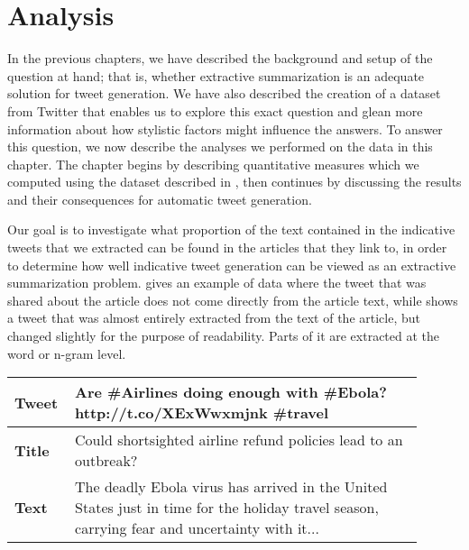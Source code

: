 \chapter{Analysis}
\label{chap:analysis}

In the previous chapters, we have described the background and setup of the question at hand; that is, whether extractive summarization is an adequate solution for tweet generation. We have also described the creation of a dataset from Twitter that enables us to explore this exact question and glean more information about how stylistic factors might influence the answers. To answer this question, we now describe the analyses we performed on the data in this chapter. The chapter begins by describing quantitative measures which we computed using the dataset described in , then continues by discussing the results and their consequences for automatic tweet generation.

Our goal is to investigate what proportion of the text contained in the indicative tweets that we extracted can be found in the articles that they link to, in order to determine how well indicative tweet generation can be viewed as an extractive summarization problem.  gives an example of data where the tweet that was shared about the article does not come directly from the article text, while  shows a tweet that was almost entirely extracted from the text of the article, but changed slightly for the purpose of readability. Parts of it are extracted at the word or n-gram level. 


\begin{table}[!t]
\centering
\begin{tabular}{|p{0.1\linewidth}|p{0.8\linewidth}|}
\hline
\textbf{Tweet} &  Are \#Airlines doing enough with \#Ebola? http://t.co/XExWwxmjnk \#travel \\ \hline
\textbf{Title} &  Could shortsighted airline refund policies lead to an outbreak? \\  \hline
\textbf{Text}  &  The deadly Ebola virus has arrived in the United States just in time for the holiday travel season, carrying fear and uncertainty with it... \\ \hline
\end{tabular}
\label{tab:noextract}
\end{table}

